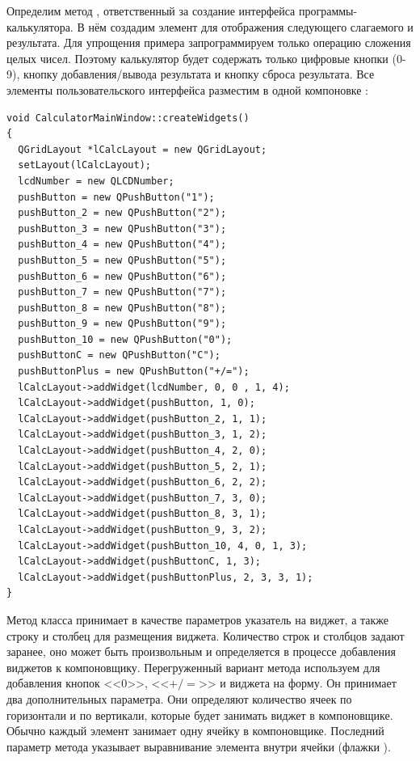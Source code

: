 Определим метод , ответственный за создание интерфейса программы-калькулятора. В
нём создадим элемент  для отображения следующего слагаемого и результата. Для упрощения примера
запрограммируем только операцию сложения целых чисел. Поэтому калькулятор будет содержать только цифровые кнопки (0-9),
кнопку добавления/вывода результата и кнопку сброса результата. Все элементы пользовательского интерфейса разместим в
одной компоновке :
\begin{lstlisting}
void CalculatorMainWindow::createWidgets()
{
  QGridLayout *lCalcLayout = new QGridLayout;
  setLayout(lCalcLayout);
  lcdNumber = new QLCDNumber;
  pushButton = new QPushButton("1");
  pushButton_2 = new QPushButton("2");
  pushButton_3 = new QPushButton("3");
  pushButton_4 = new QPushButton("4");
  pushButton_5 = new QPushButton("5");
  pushButton_6 = new QPushButton("6");
  pushButton_7 = new QPushButton("7");
  pushButton_8 = new QPushButton("8");
  pushButton_9 = new QPushButton("9");
  pushButton_10 = new QPushButton("0");
  pushButtonC = new QPushButton("C");
  pushButtonPlus = new QPushButton("+/=");
  lCalcLayout->addWidget(lcdNumber, 0, 0 , 1, 4);
  lCalcLayout->addWidget(pushButton, 1, 0);
  lCalcLayout->addWidget(pushButton_2, 1, 1);
  lCalcLayout->addWidget(pushButton_3, 1, 2);
  lCalcLayout->addWidget(pushButton_4, 2, 0);
  lCalcLayout->addWidget(pushButton_5, 2, 1);
  lCalcLayout->addWidget(pushButton_6, 2, 2);
  lCalcLayout->addWidget(pushButton_7, 3, 0);
  lCalcLayout->addWidget(pushButton_8, 3, 1);
  lCalcLayout->addWidget(pushButton_9, 3, 2);
  lCalcLayout->addWidget(pushButton_10, 4, 0, 1, 3);
  lCalcLayout->addWidget(pushButtonC, 1, 3);
  lCalcLayout->addWidget(pushButtonPlus, 2, 3, 3, 1);
}
\end{lstlisting}

Метод  класса  принимает в качестве параметров указатель на виджет, а также
строку и столбец для размещения виджета. Количество строк и столбцов задают заранее, оно может быть произвольным и
определяется в процессе добавления виджетов к компоновщику.
Перегруженный вариант метода  используем для добавления кнопок <<0>>, <<$+/=$>> и
виджета  на форму. Он принимает два дополнительных параметра. Они определяют количество ячеек по горизонтали
и по вертикали, которые будет занимать виджет в
компоновщике. Обычно каждый элемент занимает одну ячейку в
компоновщике. Последний параметр метода  указывает
выравнивание элемента внутри ячейки (флажки ).

